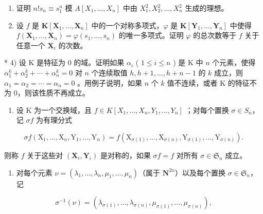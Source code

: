 \begin{enumerate}
\def\labelenumi{\arabic{enumi})}
\setcounter{enumi}{1}
\item
  证明 \(n! s_n \equiv s_1^n\) 模 \(A[X_1, \ldots, X_n]\) 中由 \(X_1^2, X_2^2, \ldots, X_n^2\) 生成的理想。
\item
  设 \(f\) 是 \(\mathbf{K}[\mathbf{X}_1, \ldots, \mathbf{X}_n]\) 中的一个对称多项式，\(\varphi\) 是 \(\mathbf{K}[\mathbf{Y}_1, \ldots, \mathbf{Y}_n]\) 中使得 \(f(\mathbf{X}_1, \ldots, \mathbf{X}_n) = \varphi(s_1, \ldots, s_n)\) 的唯一多项式。证明 \(\varphi\) 的总次数等于 \(f\) 关于任意一个 \(\mathbf{X}_i\) 的次数。
\end{enumerate}

* 4) 设 K 是特征为 0 的域。证明如果 \(\alpha_{i}\) ( \(1 \leqslant i \leqslant n\) ) 是 K 中 \(n\) 个元素，使得 \(\alpha_{1}^{k} + \alpha_{2}^{k} + \cdots + \alpha_{n}^{k} = 0\) 对 \(n\) 个连续取值 \(h, h+1, \ldots, h+n-1\) 的 \(k\) 成立，则 \(\alpha_{1} = \alpha_{2} = \cdots = \alpha_{n} = 0\) 。用例子说明，如果 \(n\) 个 \(k\) 值不连续，或者 K 的特征不为 0，则该性质不再成立。

\begin{enumerate}
\def\labelenumi{\arabic{enumi})}
\setcounter{enumi}{4}
\tightlist
\item
  设 K 为一个交换域，且 \(f \in K[X_{1}, \ldots, X_{n}, Y_{1}, \ldots, Y_{n}]\) ；对每个置换 \(\sigma \in S_{n}\)，记 \(\sigma f\) 为有理分式
\end{enumerate}

\[
\sigma f \left(\mathrm{X} _ {1}, \dots , \mathrm{X} _ {n}, \mathrm{Y} _ {1}, \dots , \mathrm{Y} _ {n}\right) = f \left(\mathrm{X} _ {\sigma (1)}, \dots , \mathrm{X} _ {\sigma (n)}, \mathrm{Y} _ {\sigma (1)}, \dots , \mathrm{Y} _ {\sigma (n)}\right).
\]

则称 \(f\) 关于这些对 \((\mathbf{X}_i, \mathbf{Y}_i)\) 是对称的，如果 \(\sigma f = f\) 对所有 \(\sigma \in \mathfrak{S}_n\) 成立。

\begin{enumerate}
\def\labelenumi{\alph{enumi})}
\tightlist
\item
  对每个元素 \(\nu = (\lambda_1, \ldots, \lambda_n, \mu_1, \ldots, \mu_n)\)（属于 \(\mathbf{N}^{2n}\)）以及每个置换 \(\sigma \in \mathfrak{S}_n\)，记
\end{enumerate}

\[
\sigma^ {- 1} (\nu) = \left(\lambda_ {\sigma (1)}, \dots , \lambda_ {\sigma (n)}, \mu_ {\sigma (1)}, \dots , \mu_ {\sigma (n)}\right),
\]

